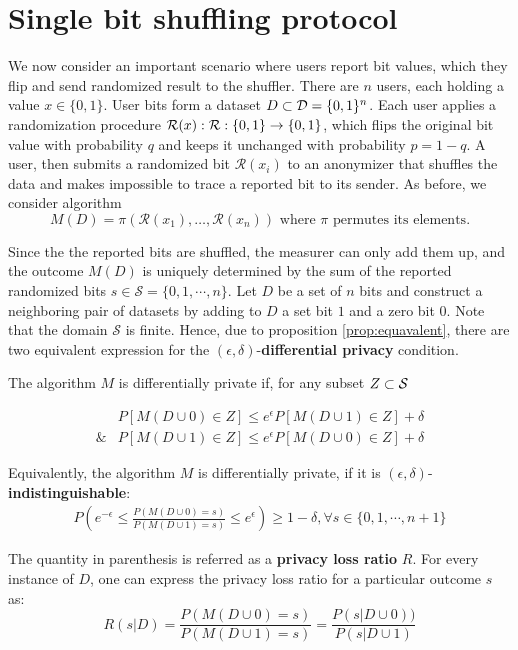 \documentclass[11pt]{article}
\newcommand{\cR}{\mathcal{R}}
\newcommand{\Dsp}{\mathcal{D}}
\newcommand{\Ssp}{\mathcal{S}}
\begin{document}
\section{Single bit shuffling protocol}

We now consider an important scenario where users report bit values, which they flip and send randomized result to the shuffler. 
There are $n$ users, each holding a value $x \in \{0,1\}$.  User bits form a dataset $D  \cont \Dsp = \{0,1\}^n$. 
Each user applies a randomization procedure $\cR(x): \map{\cR}{\{0,1\}}{\{0,1\}}$, which flips the original bit value with probability $q$ and keeps it unchanged with probability $p=1-q$.  
A user, then submits a randomized bit $\cR(x_i)$ to an anonymizer that shuffles the data and makes impossible to trace a reported bit to its sender. As before, we consider algorithm
\[
M(D) = \pi (\cR(x_1), \dots , \cR(x_n)) \text{ where } \pi \text{ permutes its elements}. 
\]

Since the the reported bits are shuffled, the measurer can only add them up, and the outcome $M(D)$ is uniquely determined by the sum of the reported randomized bits $s \in \Ssp = \{0,1,\cdots,n\}$. Let $D$ be a set of $n$ bits and construct a neighboring pair of datasets by adding to $D$ a set bit $1$ and a zero bit $0$.  Note that the domain $\Ssp$ is finite.  Hence, due to proposition \ref{prop:equavalent}, there are two equivalent expression for the $(\epsilon,\delta)$-\textbf{differential privacy} condition.

The algorithm $M$ is differentially private if, for any subset $Z \cont  \Ssp$

\begin{align} \label{eq:bited} 
 & P[M(D \cup 0) \in Z] \le e^{\epsilon}P[M(D \cup 1) \in Z] + \delta \\
\& & P[M(D \cup 1) \in Z] \le e^{\epsilon}P[M(D \cup 0) \in Z] + \delta 
\end{align}

Equivalently, the algorithm $M$ is differentially private, if it is $(\epsilon,\delta)$-\textbf{indistinguishable}: 
\begin{align} \label{eq:bitind} 
P \left (   e^{-\epsilon} \le \frac{P(M(D \cup 0) = s)}{P(M(D \cup 1) = s)} \le e^{\epsilon} \right ) \ge 1 - \delta, \forall s \in \{0,1,\cdots,n+1\}
\end{align}

The quantity in parenthesis is referred as  a \textbf{privacy loss ratio} $R$.  For every instance of $D$, one can express the privacy loss ratio for a particular outcome $s$ as:
\begin{equation} \label{eq:1} 
R(s|D)= \frac{P(M(D \cup 0) = s)}{P(M(D \cup 1) = s)}  = \frac{P(s|D \cup 0) )}{P(s|D \cup 1)} 
\end{equation}
\end{document}
